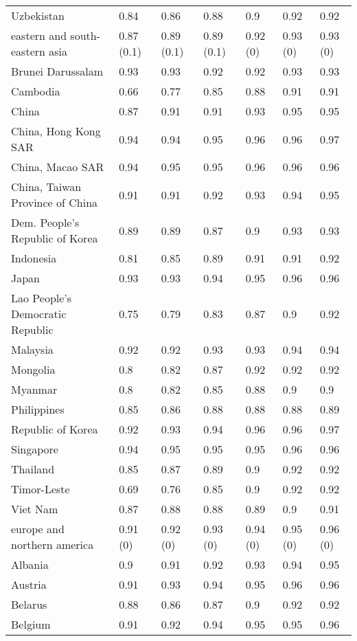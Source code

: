 \begin{longtable}[t]{lllllll}
Uzbekistan & 0.84 & 0.86 & 0.88 & 0.9 & 0.92 & 0.92\\
eastern and south-eastern asia & 0.87 (0.1) & 0.89 (0.1) & 0.89 (0.1) & 0.92 (0) & 0.93 (0) & 0.93 (0)\\
Brunei Darussalam & 0.93 & 0.93 & 0.92 & 0.92 & 0.93 & 0.93\\
\addlinespace
Cambodia & 0.66 & 0.77 & 0.85 & 0.88 & 0.91 & 0.91\\
China & 0.87 & 0.91 & 0.91 & 0.93 & 0.95 & 0.95\\
China, Hong Kong SAR & 0.94 & 0.94 & 0.95 & 0.96 & 0.96 & 0.97\\
China, Macao SAR & 0.94 & 0.95 & 0.95 & 0.96 & 0.96 & 0.96\\
China, Taiwan Province of China & 0.91 & 0.91 & 0.92 & 0.93 & 0.94 & 0.95\\
\addlinespace
Dem. People's Republic of Korea & 0.89 & 0.89 & 0.87 & 0.9 & 0.93 & 0.93\\
Indonesia & 0.81 & 0.85 & 0.89 & 0.91 & 0.91 & 0.92\\
Japan & 0.93 & 0.93 & 0.94 & 0.95 & 0.96 & 0.96\\
Lao People's Democratic Republic & 0.75 & 0.79 & 0.83 & 0.87 & 0.9 & 0.92\\
Malaysia & 0.92 & 0.92 & 0.93 & 0.93 & 0.94 & 0.94\\
\addlinespace
Mongolia & 0.8 & 0.82 & 0.87 & 0.92 & 0.92 & 0.92\\
Myanmar & 0.8 & 0.82 & 0.85 & 0.88 & 0.9 & 0.9\\
Philippines & 0.85 & 0.86 & 0.88 & 0.88 & 0.88 & 0.89\\
Republic of Korea & 0.92 & 0.93 & 0.94 & 0.96 & 0.96 & 0.97\\
Singapore & 0.94 & 0.95 & 0.95 & 0.95 & 0.96 & 0.96\\
\addlinespace
Thailand & 0.85 & 0.87 & 0.89 & 0.9 & 0.92 & 0.92\\
Timor-Leste & 0.69 & 0.76 & 0.85 & 0.9 & 0.92 & 0.92\\
Viet Nam & 0.87 & 0.88 & 0.88 & 0.89 & 0.9 & 0.91\\
europe and northern america & 0.91 (0) & 0.92 (0) & 0.93 (0) & 0.94 (0) & 0.95 (0) & 0.96 (0)\\
Albania & 0.9 & 0.91 & 0.92 & 0.93 & 0.94 & 0.95\\
\addlinespace
Austria & 0.91 & 0.93 & 0.94 & 0.95 & 0.96 & 0.96\\
Belarus & 0.88 & 0.86 & 0.87 & 0.9 & 0.92 & 0.92\\
Belgium & 0.91 & 0.92 & 0.94 & 0.95 & 0.95 & 0.96\\

\end{longtable}
